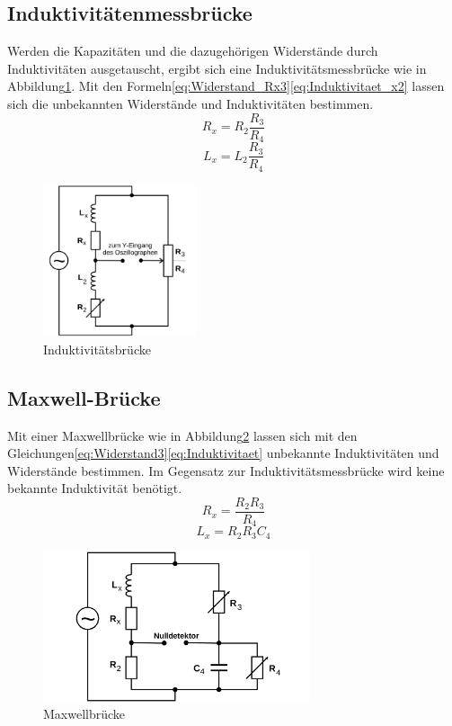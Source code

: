 \subsection{Induktivitätenmessbrücke}
Werden die Kapazitäten und die dazugehörigen Widerstände durch Induktivitäten ausgetauscht,
 ergibt sich eine Induktivitätsmessbrücke wie in Abbildung\ref{fig:indbruecke}.
Mit den Formeln\ref{eq:Widerstand_Rx3}\ref{eq:Induktivitaet_x2} lassen sich die
unbekannten Widerstände und Induktivitäten bestimmen.
\begin{equation}
R_x=R_2\frac{R_3}{R_4}
\label{eq:Widerstand_Rx3}
\end{equation}
\begin{equation}
L_x=L_2 \frac{R_3}{R_4}
\label{eq:Induktivitaet_x2}
\end{equation}
\begin{figure}
  \centering
  \includegraphics[width=0.4\textwidth]{Bilder/Induktivitaetsbruecke.png}
  \caption{Induktivitätsbrücke}
  \label{fig:indbruecke}
\end{figure}
\subsection{Maxwell-Brücke}
Mit einer Maxwellbrücke wie in Abbildung\ref{fig:Maxwellb} lassen sich mit
den Gleichungen\eqref{eq:Widerstand3}\eqref{eq:Induktivitaet} unbekannte
Induktivitäten und Widerstände bestimmen. Im Gegensatz zur Induktivitätsmessbrücke
wird keine bekannte Induktivität benötigt.
\begin{equation}
R_x= \frac{R_2 R_3}{R_4}
\label{eq:Widerstand3}
\end{equation}
\begin{equation}
L_x=R_2 R_3 C_4
\label{eq:Induktivitaet}
\end{equation}
\begin{figure}
  \centering
  \includegraphics[width=0.7\textwidth]{Bilder/Maxwellbruecke.png}
  \caption{Maxwellbrücke}
  \label{fig:Maxwellb}
\end{figure}
